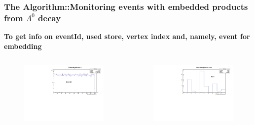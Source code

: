 \documentclass[dvipsnames] {beamer}
\begin{document}
         \begin{frame}
         \frametitle{\bf \centering \footnotesize The Algorithm::Monitoring events with embedded products from $\Lambda^{0}$ decay}
         \begin{block}{\bf \centering \tiny To get info on eventId, used store, vertex index and, namely, event for embedding}
         \begin{columns}[t]
           \begin{figure}[H]
             \includegraphics[width=1.\linewidth]{EmbeddingMonitorId.pdf}
           \end{figure}        
           \begin{figure}[H]
              \includegraphics[width=1.\linewidth]{EmbeddingMonitorStore.pdf}
           \end{figure}


\end{columns}
\end{block}
\end{frame}
\end{document}
